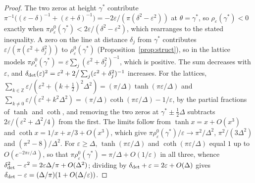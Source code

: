 \begin{proof}
The two zeros at height $\gamma^*$ contribute $\pi^{-1}\big((\varepsilon-\delta)^{-1}+(\varepsilon+\delta)^{-1}\big)=-2\varepsilon/(\pi(\delta^2-\varepsilon^2))$ at $\theta=\gamma^*$, so $\rho_\varepsilon(\gamma^*)<0$ exactly when $\pi\rho^0_\varepsilon(\gamma^*)<2\varepsilon/(\delta^2-\varepsilon^2)$, which rearranges to the stated inequality. A zero on the line at distance $\delta_j$ from $\gamma^*$ contributes $\varepsilon/(\pi(\varepsilon^2+\delta_j^2))$ to $\rho^0_\varepsilon(\gamma^*)$ (Proposition~\ref{prop:struct}), so in the lattice models $\pi\rho^0_\varepsilon(\gamma^*)=\varepsilon\sum_j(\varepsilon^2+\delta_j^2)^{-1}$, which is positive. The sum decreases with $\varepsilon$, and $\delta_{\rm det}(\varepsilon)^2=\varepsilon^2+2\big/\sum_j(\varepsilon^2+\delta_j^2)^{-1}$ increases. For the lattices, $\sum_{k\in\mathbb Z}\varepsilon/(\varepsilon^2+(k+\frac12)^2\Delta^2)=(\pi/\Delta)\tanh(\pi\varepsilon/\Delta)$ and $\sum_{k\ne0}\varepsilon/(\varepsilon^2+k^2\Delta^2)=(\pi/\Delta)\coth(\pi\varepsilon/\Delta)-1/\varepsilon$, by the partial fractions of $\tanh$ and $\coth$, and removing the two zeros at $\gamma^*\pm\frac12\Delta$ subtracts $2\varepsilon/(\varepsilon^2+\Delta^2/4)$ from the first. The limits follow from $\tanh x=x+O(x^3)$ and $\coth x=1/x+x/3+O(x^3)$, which give $\pi\rho^0_\varepsilon(\gamma^*)/\varepsilon\to\pi^2/\Delta^2$, $\pi^2/(3\Delta^2)$ and $(\pi^2-8)/\Delta^2$. For $\varepsilon\ge\Delta$, $\tanh(\pi\varepsilon/\Delta)$ and $\coth(\pi\varepsilon/\Delta)$ equal $1$ up to $O(e^{-2\pi\varepsilon/\Delta})$, so that $\pi\rho^0_\varepsilon(\gamma^*)=\pi/\Delta+O(1/\varepsilon)$ in all three, whence $\delta_{\rm det}^2-\varepsilon^2=2\varepsilon\Delta/\pi+O(\Delta^2)$; dividing by $\delta_{\rm det}+\varepsilon=2\varepsilon+O(\Delta)$ gives $\delta_{\rm det}-\varepsilon=(\Delta/\pi)(1+O(\Delta/\varepsilon))$.
\end{proof}

